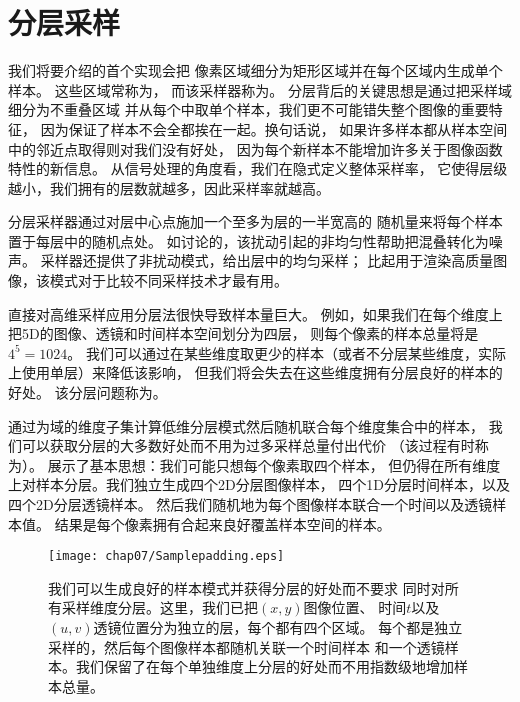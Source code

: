 \section{分层采样}\label{sec:分层采样}
我们将要介绍的首个实现会把
像素区域细分为矩形区域并在每个区域内生成单个样本。
这些区域常称为，
而该采样器称为。
分层背后的关键思想是通过把采样域细分为不重叠区域
并从每个中取单个样本，我们更不可能错失整个图像的重要特征，
因为保证了样本不会全都挨在一起。换句话说，
如果许多样本都从样本空间中的邻近点取得则对我们没有好处，
因为每个新样本不能增加许多关于图像函数特性的新信息。
从信号处理的角度看，我们在隐式定义整体采样率，
它使得层级越小，我们拥有的层数就越多，因此采样率就越高。

分层采样器通过对层中心点施加一个至多为层的一半宽高的
随机量来将每个样本置于每层中的随机点处。
如讨论的，该扰动引起的非均匀性帮助把混叠转化为噪声。
采样器还提供了非扰动模式，给出层中的均匀采样；
比起用于渲染高质量图像，该模式对于比较不同采样技术才最有用。

直接对高维采样应用分层法很快导致样本量巨大。
例如，如果我们在每个维度上把5D的图像、透镜和时间样本空间划分为四层，
则每个像素的样本总量将是$4^5=1024$。
我们可以通过在某些维度取更少的样本（或者不分层某些维度，实际上使用单层）来降低该影响，
但我们将会失去在这些维度拥有分层良好的样本的好处。
该分层问题称为。

通过为域的维度子集计算低维分层模式然后随机联合每个维度集合中的样本，
我们可以获取分层的大多数好处而不用为过多采样总量付出代价
（该过程有时称为）。
展示了基本思想：我们可能只想每个像素取四个样本，
但仍得在所有维度上对样本分层。我们独立生成四个2D分层图像样本，
四个1D分层时间样本，以及四个2D分层透镜样本。
然后我们随机地为每个图像样本联合一个时间以及透镜样本值。
结果是每个像素拥有合起来良好覆盖样本空间的样本。
\begin{figure}[htbp]
    \centering\texttt{[image: chap07/Samplepadding.eps]}
    \caption{我们可以生成良好的样本模式并获得分层的好处而不要求
        同时对所有采样维度分层。这里，我们已把$(x,y)$图像位置、
        时间$t$以及$(u,v)$透镜位置分为独立的层，每个都有四个区域。
        每个都是独立采样的，然后每个图像样本都随机关联一个时间样本
        和一个透镜样本。我们保留了在每个单独维度上分层的好处而不用指数级地增加样本总量。}
    \label{fig:7.16}
\end{figure}

